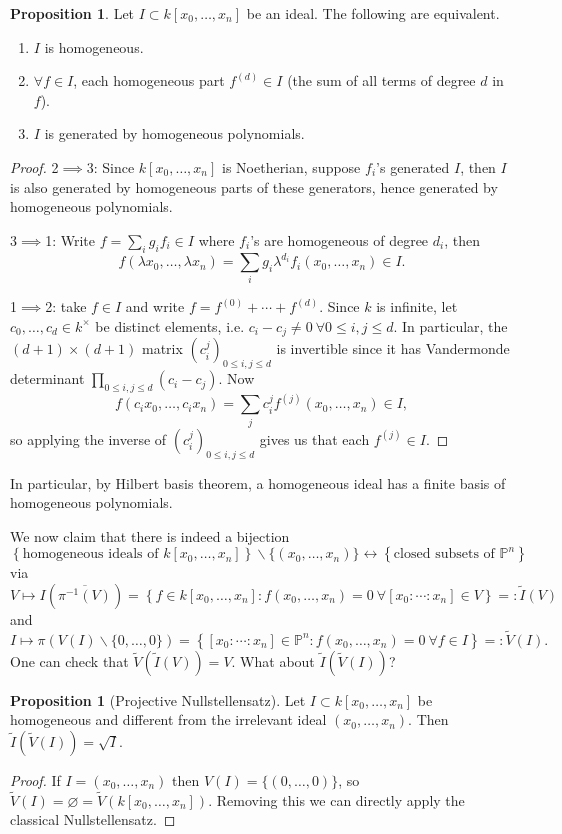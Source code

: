 \documentclass{article}
\newcommand{\p}{\mathbb{P}}
\theoremstyle{definition}
\newtheorem{prop}[defn]{Proposition}
\begin{document}
\begin{prop}
Let $I\subset k[x_0,\ldots,x_n]$ be an ideal. The following are equivalent.
\begin{enumerate}
\item $I$ is homogeneous.
\item $\forall f\in I$, each homogeneous part $f^{(d)}\in I$ (the sum of all terms of degree $d$ in $f$).
\item $I$ is generated by homogeneous polynomials.
\end{enumerate}
\begin{proof}
2$\implies$3: Since $k[x_0,\ldots,x_n]$ is Noetherian, suppose $f_i$'s generated $I$, then $I$ is also generated by homogeneous parts of these generators, hence generated by homogeneous polynomials.

3$\implies$1: Write $f=\sum_i g_i f_i\in I$ where $f_i$'s are homogeneous of degree $d_i$, then
\[
f(\lambda x_0,\ldots,\lambda x_n)=\sum_i g_i \lambda^{d_i} f_i(x_0,\ldots,x_n)\in I.
\]

1$\implies$2: take $f\in I$ and write $f=f^{(0)}+\cdots+f^{(d)}$. Since $k$ is infinite, let $c_0,\ldots,c_d\in k^\times$ be distinct elements, i.e. $c_i-c_j\neq 0 \ \forall 0\leq i,j\leq d$. In particular, the $(d+1)\times(d+1)$ matrix $(c_i^j)_{0\leq i,j\leq d}$ is invertible since it has Vandermonde determinant $\prod_{0\leq i,j\leq d} (c_i-c_j)$. Now
\[
f(c_ix_0,\ldots,c_ix_n)=\sum_j c_i^j f^{(j)}(x_0,\ldots,x_n)\in I,
\]
so applying the inverse of $(c_i^j)_{0\leq i,j\leq d}$ gives us that each $f^{(j)}\in I$.
\end{proof}
\end{prop}
In particular, by Hilbert basis theorem, a homogeneous ideal has a finite basis of homogeneous polynomials.

We now claim that there is indeed a bijection
\[
\left\{\text{homogeneous ideals of }k[x_0,\ldots,x_n]\right\}\backslash\{(x_0,\ldots,x_n)\}\leftrightarrow\left\{\text{closed subsets of }\p^n\right\}
\]
via
\[
V\mapsto I\left(\overline{\pi^{-1}(V)}\right)=\left\{f\in k[x_0,\ldots,x_n]:f(x_0,\ldots,x_n)=0 \ \forall [x_0:\cdots:x_n]\in V\right\}=:\widetilde I(V)
\]
and
\[
I\mapsto\pi\left(V(I)\backslash\{0,\ldots,0\}\right)=\left\{[x_0:\cdots:x_n]\in\p^n:f(x_0,\ldots,x_n)=0 \ \forall f\in I\right\}=:\widetilde V(I).
\]
One can check that $\widetilde V\left(\widetilde I(V)\right)=V$. What about $\widetilde I\left(\widetilde V(I)\right)$?

\begin{prop}[Projective Nullstellensatz]
\label{prop:projNSS}
Let $I\subset k[x_0,\ldots,x_n]$ be homogeneous and different from the irrelevant ideal $(x_0,\ldots,x_n)$. Then $\widetilde I\left(\widetilde V(I)\right)=\sqrt I$.
\end{prop}
\begin{proof}
If $I=(x_0,\ldots,x_n)$ then $V(I)=\{(0,\ldots,0)\}$, so $\widetilde V(I)=\varnothing=\widetilde V\left(k[x_0,\ldots,x_n]\right)$. Removing this we can directly apply the classical Nullstellensatz.
\end{proof}
\end{document}
